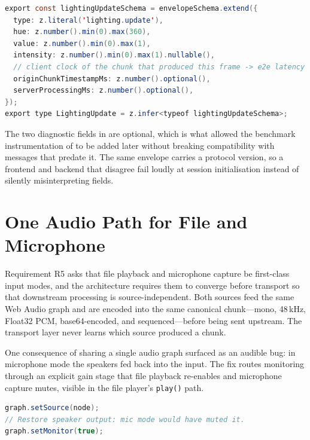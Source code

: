\begin{lstlisting}[language=Java,caption={Downstream lighting message, defined once in the protocol package (TypeScript/Zod). The backend mirrors it in Pydantic.},label={lst:lighting-schema}]
export const lightingUpdateSchema = envelopeSchema.extend({
  type: z.literal('lighting.update'),
  hue: z.number().min(0).max(360),
  value: z.number().min(0).max(1),
  intensity: z.number().min(0).max(1).nullable(),
  // client clock of the chunk that produced this frame -> e2e latency
  originChunkTimestampMs: z.number().optional(),
  serverProcessingMs: z.number().optional(),
});
export type LightingUpdate = z.infer<typeof lightingUpdateSchema>;
\end{lstlisting}

The two diagnostic fields in  are optional, which is what allowed the benchmark instrumentation of  to be added later without breaking compatibility with messages that predate it. The same envelope carries a protocol version, so a frontend and backend that disagree fail loudly at session initialisation instead of silently misinterpreting fields.

\section{One Audio Path for File and Microphone}
\label{sec:impl-audio}

Requirement R5 asks that file playback and microphone capture be first-class input modes, and the architecture requires them to converge before transport so that downstream processing is source-independent. Both sources feed the same Web Audio graph and are encoded into the same canonical chunk---mono, 48\,kHz, Float32 PCM, base64-encoded, and sequenced---before being sent upstream. The transport layer never learns which source produced a chunk.

One consequence of sharing a single audio graph surfaced as an audible bug: in microphone mode the speakers fed back into the input. The fix routes monitoring through an explicit gain stage that file playback re-enables and microphone capture mutes, visible in the file player's \texttt{play()} path.

\begin{lstlisting}[language=Java,caption={Restoring speaker monitoring on file playback; microphone mode mutes the same stage to prevent feedback.},label={lst:monitor}]
graph.setSource(node);
// Restore speaker output: mic mode would have muted it.
graph.setMonitor(true);
\end{lstlisting}

